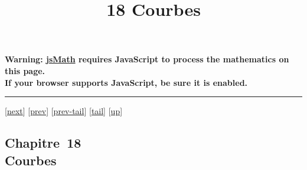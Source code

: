 \documentclass[]{article}
\title{18 Courbes}
\author{}
\date{}
\begin{document}
\maketitle

\textbf{Warning: \href{http://www.math.union.edu/locate/jsMath}{jsMath}
requires JavaScript to process the mathematics on this page.\\ If your
browser supports JavaScript, be sure it is enabled.}

\begin{center}\rule{3in}{0.4pt}\end{center}

{[}\href{coursch20.html}{next}{]} {[}\href{coursch18.html}{prev}{]}
{[}\href{coursch18.html\#tailcoursch18.html}{prev-tail}{]}
{[}\hyperref[tailcoursch19.html]{tail}{]}
{[}\href{cours.html\#coursch19.html}{up}{]}

\subsection{Chapitre~18\\Courbes}
\end{document}
